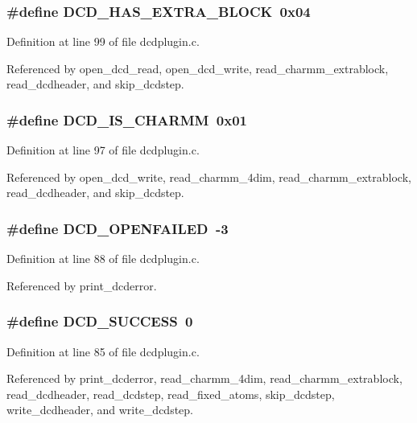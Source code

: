 \subsubsection{\setlength{\rightskip}{0pt plus 5cm}\#define DCD\_\-HAS\_\-EXTRA\_\-BLOCK\ 0x04}\label{dcdplugin_8c_a16}




Definition at line 99 of file dcdplugin.c.

Referenced by open\_\-dcd\_\-read, open\_\-dcd\_\-write, read\_\-charmm\_\-extrablock, read\_\-dcdheader, and skip\_\-dcdstep.
\subsubsection{\setlength{\rightskip}{0pt plus 5cm}\#define DCD\_\-IS\_\-CHARMM\ 0x01}\label{dcdplugin_8c_a14}




Definition at line 97 of file dcdplugin.c.

Referenced by open\_\-dcd\_\-write, read\_\-charmm\_\-4dim, read\_\-charmm\_\-extrablock, read\_\-dcdheader, and skip\_\-dcdstep.
\subsubsection{\setlength{\rightskip}{0pt plus 5cm}\#define DCD\_\-OPENFAILED\ -3}\label{dcdplugin_8c_a7}




Definition at line 88 of file dcdplugin.c.

Referenced by print\_\-dcderror.
\subsubsection{\setlength{\rightskip}{0pt plus 5cm}\#define DCD\_\-SUCCESS\ 0}\label{dcdplugin_8c_a4}




Definition at line 85 of file dcdplugin.c.

Referenced by print\_\-dcderror, read\_\-charmm\_\-4dim, read\_\-charmm\_\-extrablock, read\_\-dcdheader, read\_\-dcdstep, read\_\-fixed\_\-atoms, skip\_\-dcdstep, write\_\-dcdheader, and write\_\-dcdstep.
